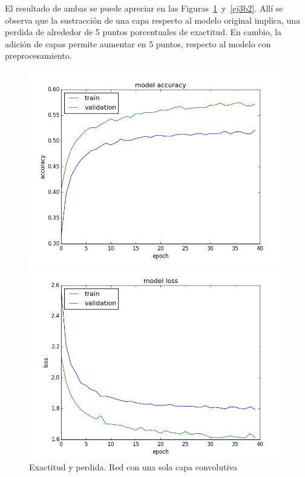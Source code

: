 \documentclass{article}[12pt, a4paper]
\begin{document}
El resultado de ambas se puede apreciar en las Figuras~\ref{ej3b1}~y~\ref{ej3b2}. All\'i se observa que
la sustracci\'on de una capa respecto al modelo original implica, una perdida de alrededor de 5 puntos
porcentuales de exactitud. En cambio, la adici\'on de capas permite aumentar en 5 puntos, respecto al modelo
con preprocesamiento. 

\begin{figure}[h!]
	\begin{minipage}[h]{0.49\textwidth}
		\includegraphics[width=\textwidth]{ej3b1acc}
	\end{minipage}
	\begin{minipage}[h]{0.49\textwidth}
		\includegraphics[width=\textwidth]{ej3b1loss}
	\end{minipage}
	\caption{Exactitud y perdida. Red con una sola capa convolutiva}
	\label{ej3b1}
\end{figure}
	
\end{document}
